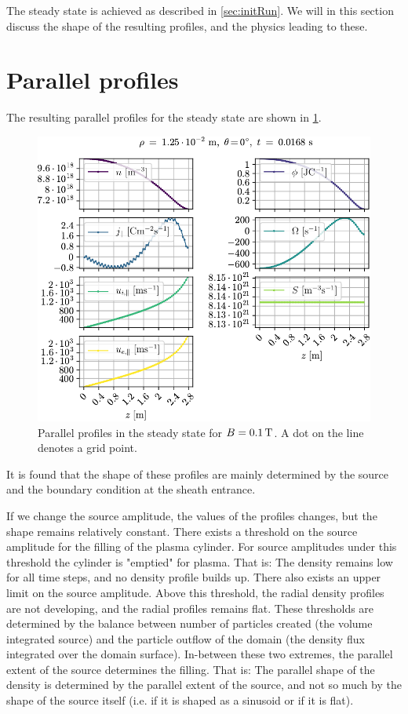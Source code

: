 The steady state is achieved as described in \cref{sec:initRun}.
We will in this section discuss the shape of the resulting profiles, and the physics leading to these.

\section{Parallel profiles}
\label{sec:parProf}
%
The resulting parallel profiles for the steady state are shown in \cref{fig:parProfs}.
%
\begin{figure}[htb]
    \centering
    \includegraphics{fig/results/1DProfiles/B010Par}
    \caption{Parallel profiles in the steady state for $B=0.1\, \text{T}$.
        A dot on the line denotes a grid point.}
    \label{fig:parProfs}
\end{figure}
%
It is found that the shape of these profiles are mainly determined by the source and the boundary condition at the sheath entrance.

If we change the source amplitude, the values of the profiles changes, but the shape remains relatively constant.
There exists a threshold on the source amplitude for the filling of the plasma cylinder.
For source amplitudes under this threshold the cylinder is "emptied" for plasma.
That is: The density remains low for all time steps, and no density profile builds up.
There also exists an upper limit on the source amplitude.
Above this threshold, the radial density profiles are not developing, and the radial profiles remains flat.
These thresholds are determined by the balance between number of particles created (the volume integrated source) and the particle outflow of the domain (the density flux integrated over the domain surface).
In-between these two extremes, the parallel extent of the source determines the filling.
That is: The parallel shape of the density is determined by the parallel extent of the source, and not so much by the shape of the source itself (i.e. if it is shaped as a sinusoid or if it is flat).

